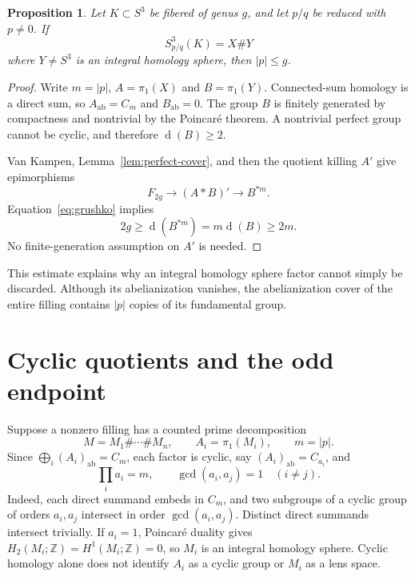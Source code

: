 \documentclass[11pt]{article}
\newtheorem{proposition}[theorem]{Proposition}
\theoremstyle{remark}
\newcommand{\Z}{\mathbb Z}
\newcommand{\ab}{\mathrm{ab}}
\newcommand{\gen}{\operatorname{d}}
\begin{document}

\begin{proposition}\label{prop:homology-sphere}
Let $K\subset S^3$ be fibered of genus $g$, and let $p/q$ be reduced with $p\ne0$. If
\[
 S^3_{p/q}(K)=X\#Y
\]
where $Y\ne S^3$ is an integral homology sphere, then $|p|\leq g$.
\end{proposition}
\begin{proof}
Write $m=|p|$, $A=\pi_1(X)$ and $B=\pi_1(Y)$. Connected-sum homology is a direct sum, so $A_{\ab}=C_m$ and $B_{\ab}=0$. The group $B$ is finitely generated by compactness and nontrivial by the Poincar\'e theorem. A nontrivial perfect group cannot be cyclic, and therefore $\gen(B)\geq2$.

Van Kampen, Lemma~\ref{lem:perfect-cover}, and then the quotient killing $A'$ give epimorphisms
\[
 F_{2g}\longrightarrow (A*B)'\longrightarrow B^{*m}.
\]
Equation~\eqref{eq:grushko} implies
\[
 2g\geq\gen(B^{*m})=m\gen(B)\geq2m.
\]
No finite-generation assumption on $A'$ is needed.
\end{proof}

This estimate explains why an integral homology sphere factor cannot simply be discarded. Although its abelianization vanishes, the abelianization cover of the entire filling contains $|p|$ copies of its fundamental group.

\section{Cyclic quotients and the odd endpoint}\label{sec:endpoint}

Suppose a nonzero filling has a counted prime decomposition
\begin{equation}\label{eq:sum}
 M=M_1\#\cdots\#M_n,
 \qquad A_i=\pi_1(M_i),\qquad m=|p|.
\end{equation}
Since $\bigoplus_i(A_i)_{\ab}=C_m$, each factor is cyclic, say $(A_i)_{\ab}=C_{a_i}$, and
\begin{equation}\label{eq:orders}
 \prod_i a_i=m,\qquad \gcd(a_i,a_j)=1\quad(i\ne j).
\end{equation}
Indeed, each direct summand embeds in $C_m$, and two subgroups of a cyclic group of orders $a_i,a_j$ intersect in order $\gcd(a_i,a_j)$. 
Distinct direct summands intersect trivially. If $a_i=1$, Poincar\'e duality gives $H_2(M_i;\Z)=H^1(M_i;\Z)=0$, so $M_i$ is an integral homology sphere. Cyclic homology alone does not identify $A_i$ as a cyclic group or $M_i$ as a lens space.
\end{document}
